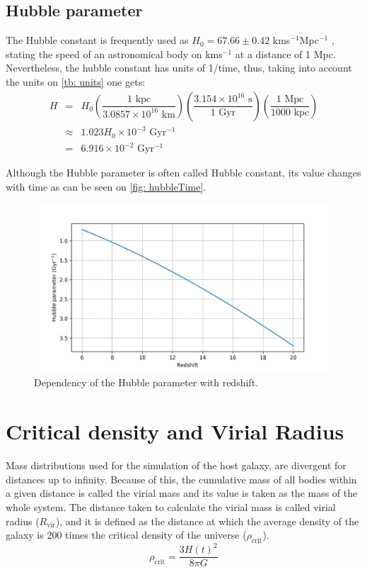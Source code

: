 		\subsection{Hubble parameter}
			The Hubble constant is frequently used as $H_0 = 67.66 \pm 0.42$ kms$^{-1}$Mpc$^{-1}$ \cite{aghanim2018planck}, stating the speed of an astronomical body on kms$^{-1}$ at a distance of 1 Mpc. Nevertheless, the hubble constant has units of 1/time, thus, taking into account the units on \autoref{tb: units} one gets:
			\begin{equation}
				\begin{array}{ccl}
					H & = & H_0 \left(\dfrac{1 \text{ kpc}}{3.0857\times10^{16} \text{ km}}\right)\left(\dfrac{3.154\times10^{16} \text{ s}}{1 \text{ Gyr}}\right)\left(\dfrac{1 \text{ Mpc}}{1000 \text{ kpc}}\right) \\
					& \approx & 1.023 H_0 \times10^{-3} \text{ Gyr$^{-1}$} \\ 
					& = & 6.916\times10^{-2}\text{ Gyr$^{-1}$}
				\end{array}
			\end{equation}
			
			Although the Hubble parameter is often called Hubble constant, its value changes with time as can be seen on \autoref{fig: hubbleTime}. %
			\begin{figure}[h]
				\centering
				\includegraphics[width=0.8\linewidth]{"../Files/Week 5/hubble_time"}
				\caption{Dependency of the Hubble parameter with redshift.}
				\label{fig: hubbleTime}
			\end{figure}
		
	\section{Critical density and Virial Radius}
		Mass distributions used for the simulation of the host galaxy, are divergent for distances up to infinity. Because of this, the cumulative mass of all bodies within a given distance is called the virial mass and its value is taken as the mass of the whole system. The distance taken to calculate the virial mass is called virial radius ($R_\text{vir}$), and it is defined as the distance at which the average density of the galaxy is 200 times the critical density of the universe ($\rho_\text{crit}$).
		\begin{equation}\label{eq: critical_density}
			\rho_\text{crit} = \dfrac{3H(t)^2}{8\pi G}
		\end{equation}
		
